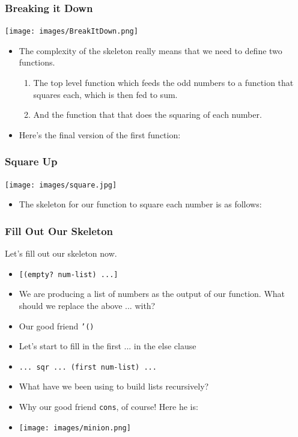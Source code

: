 \documentclass{beamer}
\begin{document}

\begin{frame}
  \frametitle{Breaking it Down}
  \centering \texttt{[image: images/BreakItDown.png]}
  \begin{itemize}
  \item<2-> The complexity of the skeleton really means that we need to define
    two functions.
    \begin{enumerate}
    \item<3-> The top level function which feeds the odd numbers to a function
      that squares each, which is then fed to sum.
    \item<4-> And the function that that does the squaring of each number.
    \end{enumerate}
  \item<5-> Here's the final version of the first function:
    \sumSquareFinal
  \end{itemize}
\end{frame}

\begin{frame}
  \frametitle{Square Up}
  \centering \texttt{[image: images/square.jpg]}
  \begin{itemize}
  \item<2-> The skeleton for our function to square each number is as follows:
    \squareSkeleton
  \end{itemize}
\end{frame}

\begin{frame}
  \frametitle{Fill Out Our Skeleton}
  Let's fill out our skeleton now.
  \begin{itemize}
  \item<2-> \texttt{[(empty? num-list) ...]}
  \item<3-> We are producing a list of numbers as the output of our function.
    What should we replace the above ... with?
  \item<4-> Our good friend \texttt{'()}
  \item<5-> Let's start to fill in the first ... in the else clause
  \item<6-> \texttt{... sqr ... (first num-list) ...}
  \item<7-> What have we been using to build lists recursively?
  \item<8-> Why our good friend \texttt{cons}, of course! Here he is:
  \item<9-> \texttt{[image: images/minion.png]}
  \end{itemize}
\end{frame}
\end{document}
